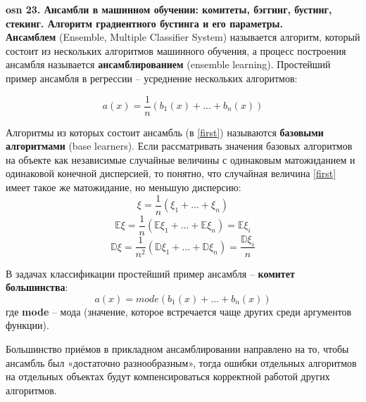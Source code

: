 \setcounter{section}{15}
\setcounter{subsection}{23}
\setcounter{equation}{0}
\textbf{\LARGE osn 23. Ансамбли в машинном обучении: комитеты, бэггинг, бустинг, стекинг. Алгоритм градиентного бустинга и его параметры.}  \\
\textbf{Ансамблем} (Ensemble, Multiple Classifier System) называется алгоритм, который состоит из нескольких алгоритмов машинного обучения, а процесс построения ансамбля называется \textbf {ансамблированием} (ensemble learning). Простейший пример ансамбля в регрессии – усреднение нескольких алгоритмов:

\begin{equation}\label{first}
a(x) = \frac{1}{n}(b_1(x)+...+b_n(x))
\end{equation}

Алгоритмы из которых состоит ансамбль (в \ref{first}) называются \textbf{базовыми алгоритмами} (base learners). Если рассматривать значения базовых алгоритмов на объекте  как независимые случайные величины с одинаковым матожиданием  и одинаковой конечной дисперсией, то понятно, что случайная величина \ref{first} имеет такое же матожидание, но меньшую дисперсию:
\begin{equation}
    \xi = \frac{1}{n}(\xi_1+...+\xi_n) 
\end{equation}
\begin{equation}
    \mathbb{E}\xi=\frac{1}{n}(\mathbb{E}\xi_1+...+\mathbb{E}\xi_n)=\mathbb{E}\xi_i
\end{equation}
\begin{equation}
    \mathbb{D}\xi=\frac{1}{n^2}(\mathbb{D}\xi_1+...+\mathbb{D}\xi_n)=\frac{\mathbb{D}\xi_i}{n}
\end{equation}

В задачах классификации простейший пример ансамбля – \textbf{комитет большинства}:
\begin{equation}\label{komitet}
a(x) = mode(b_1(x)+...+b_n(x))
\end{equation}
где  \textbf{mode} – мода (значение, которое встречается чаще других среди аргументов функции). 

Большинство приёмов в прикладном ансамблировании направлено на то, чтобы ансамбль был «достаточно разнообразным», тогда ошибки отдельных алгоритмов на отдельных объектах будут компенсироваться корректной работой других алгоритмов. 

